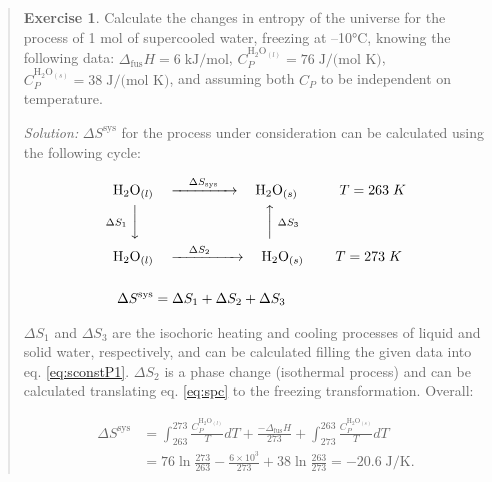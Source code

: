 \documentclass[
]{book}
\theoremstyle{definition}
\theoremstyle{definition}
\theoremstyle{definition}
\newtheorem{exercise}{Exercise}[chapter]
\theoremstyle{remark}
\begin{document}
\begin{quote}
\begin{exercise}
\protect\hypertarget{exr:supercooledEx}{}{\label{exr:supercooledEx} }Calculate the changes in entropy of the universe for the process of 1 mol of supercooled water, freezing at --10°C, knowing the following data: \(\Delta_{\mathrm{fus}}H = 6 \; \text{kJ/mol}\), \(C_P^{\mathrm{H}_2 \mathrm{O}_{(l)}}=76 \; \text{J/(mol K)}\), \(C_P^{\mathrm{H}_2 \mathrm{O}_{(s)}}=38 \; \text{J/(mol K)}\), and assuming both \(C_P\) to be independent on temperature.

\emph{Solution:} \(\Delta S^{\mathrm{sys}}\) for the process under consideration can be calculated using the following cycle:

\begin{equation}
\begin{aligned}
\mathrm{H}_2 \mathrm{O}_{(l)} & \quad \xrightarrow{\quad \Delta S_{\text{sys}} \quad} \quad \mathrm{H}_2 \mathrm{O}_{(s)} \qquad \quad T=263\;K\\
\scriptstyle{\Delta S_1} \; \bigg\downarrow \quad & \qquad \qquad \qquad \qquad \scriptstyle{\bigg\uparrow  \; \Delta S_3} \\
\mathrm{H}_2 \mathrm{O}_{(l)} & \quad \xrightarrow{\quad \Delta S_2 \qquad} \quad \mathrm{H}_2\mathrm{O}_{(s)} \qquad \; T=273\;K\\
\\
\Delta S^{\text{sys}} & = \Delta S_1 + \Delta S_2 + \Delta S_3
\end{aligned}
\label{eq:supercooledsyst}
\end{equation}

\(\Delta S_1\) and \(\Delta S_3\) are the isochoric heating and cooling processes of liquid and solid water, respectively, and can be calculated filling the given data into eq. \eqref{eq:sconstP1}. \(\Delta S_2\) is a phase change (isothermal process) and can be calculated translating eq. \eqref{eq:spc} to the freezing transformation. Overall:

\begin{equation}
\begin{aligned}
\Delta S^{\text{sys}} & = \int_{263}^{273} \frac{C_P^{\mathrm{H}_2 \mathrm{O}_{(l)}}}{T}dT+\frac{-\Delta_{\mathrm{fus}}H}{273}+\int_{273}^{263} \frac{C_P^{\mathrm{H}_2 \mathrm{O}_{(s)}}}{T}dT \\
& = 76 \ln \frac{273}{263} - \frac{6 \times 10^3}{273} + 38 \ln \frac{263}{273}= -20.6 \; \text{J/K}.
\end{aligned}
\label{eq:supercooledsyst2}
\end{equation}


\end{exercise}
\end{quote}
\end{document}
